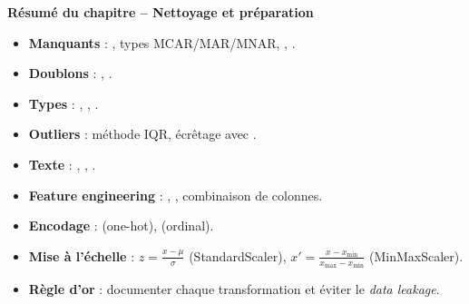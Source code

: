 \begin{formules}
\textbf{R\'esum\'e du chapitre -- Nettoyage et pr\'eparation}
\begin{itemize}
    \item \textbf{Manquants} : , types MCAR/MAR/MNAR, , .
    \item \textbf{Doublons} : , .
    \item \textbf{Types} : , , .
    \item \textbf{Outliers} : m\'ethode IQR, \'ecr\^etage avec .
    \item \textbf{Texte} : , , .
    \item \textbf{Feature engineering} : , , combinaison de colonnes.
    \item \textbf{Encodage} :  (one-hot),  (ordinal).
    \item \textbf{Mise \`a l'\'echelle} : $z = \frac{x - \mu}{\sigma}$ (StandardScaler), $x' = \frac{x - x_{\min}}{x_{\max} - x_{\min}}$ (MinMaxScaler).
    \item \textbf{R\`egle d'or} : documenter chaque transformation et \'eviter le \emph{data leakage}.
\end{itemize}
\end{formules}
